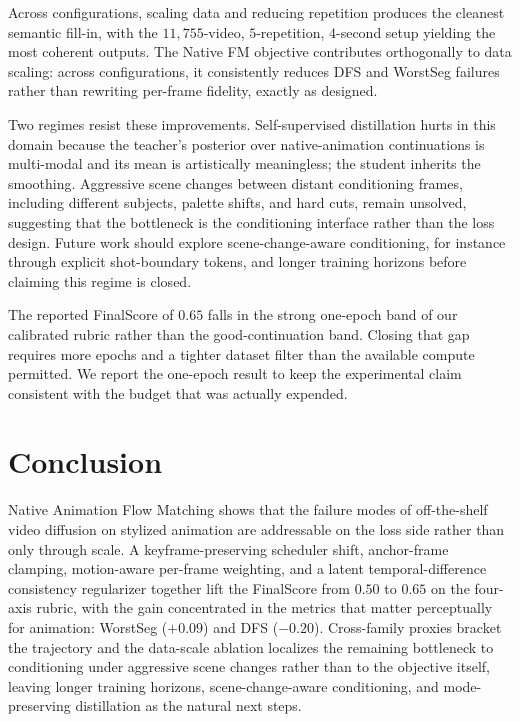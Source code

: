 \documentclass[10pt,twocolumn]{article}
\begin{document}
Across configurations, scaling data and reducing repetition produces the cleanest semantic fill-in, with the $11{,}755$-video, $5$-repetition, $4$-second setup yielding the most coherent outputs. The Native FM objective contributes orthogonally to data scaling: across configurations, it consistently reduces DFS and WorstSeg failures rather than rewriting per-frame fidelity, exactly as designed.

Two regimes resist these improvements. Self-supervised distillation hurts in this domain because the teacher's posterior over native-animation continuations is multi-modal and its mean is artistically meaningless; the student inherits the smoothing. Aggressive scene changes between distant conditioning frames, including different subjects, palette shifts, and hard cuts, remain unsolved, suggesting that the bottleneck is the conditioning interface rather than the loss design. Future work should explore scene-change-aware conditioning, for instance through explicit shot-boundary tokens, and longer training horizons before claiming this regime is closed.

The reported FinalScore of $0.65$ falls in the strong one-epoch band of our calibrated rubric rather than the good-continuation band. Closing that gap requires more epochs and a tighter dataset filter than the available compute permitted. We report the one-epoch result to keep the experimental claim consistent with the budget that was actually expended.


\section{Conclusion}

Native Animation Flow Matching shows that the failure modes of off-the-shelf video diffusion on stylized animation are addressable on the loss side rather than only through scale. A keyframe-preserving scheduler shift, anchor-frame clamping, motion-aware per-frame weighting, and a latent temporal-difference consistency regularizer together lift the FinalScore from $0.50$ to $0.65$ on the four-axis rubric, with the gain concentrated in the metrics that matter perceptually for animation: WorstSeg ($+0.09$) and DFS ($-0.20$). Cross-family proxies bracket the trajectory and the data-scale ablation localizes the remaining bottleneck to conditioning under aggressive scene changes rather than to the objective itself, leaving longer training horizons, scene-change-aware conditioning, and mode-preserving distillation as the natural next steps.
\end{document}
